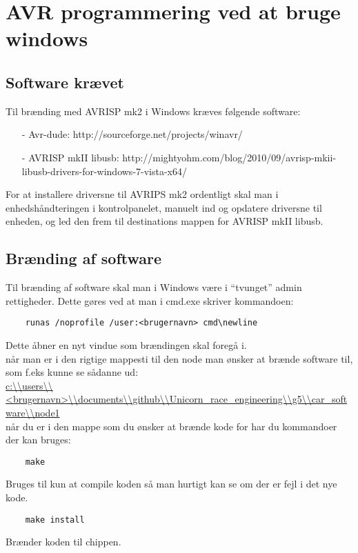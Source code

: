 \section{AVR programmering ved at bruge windows}
\subsection{Software krævet}
Til brænding med AVRISP mk2 i Windows kræves følgende software:
\begin{enumerate}
	\item[-]{Avr-dude:				http://sourceforge.net/projects/winavr/}
	\item[-]{AVRISP mkII libusb:	http://mightyohm.com/blog/2010/09/avrisp-mkii-libusb-drivers-for-windows-7-vista-x64/}
\end{enumerate}

For at installere driversne til AVRIPS mk2 ordentligt skal man i enhedshåndteringen i kontrolpanelet, manuelt ind og opdatere driversne til enheden, og led den frem til destinations mappen for AVRISP mkII libusb.

\subsection{Brænding af software}
Til brænding af software skal man i Windows være i ``tvunget'' admin rettigheder.
\newline
Dette gøres ved at man i cmd.exe skriver kommandoen:

\begin{lstlisting}
	runas /noprofile /user:<brugernavn> cmd\newline
\end{lstlisting}

Dette åbner en nyt vindue som brændingen skal foregå i.\\
når man er i den rigtige mappesti til den node man ønsker at brænde software til, som f.eks kunne se sådanne ud:\\
\url{c:\\users\\<brugernavn>\\documents\\github\\Unicorn_race_engineering\\g5\\car_software\\node1} \\
når du er i den mappe som du ønsker at brænde kode for har du kommandoer der kan bruges:

\begin{lstlisting}
	make
\end{lstlisting}

Bruges til kun at compile koden så man hurtigt kan se om der er fejl i det nye kode.

\begin{lstlisting}
	make install
\end{lstlisting}

Brænder koden til chippen.
